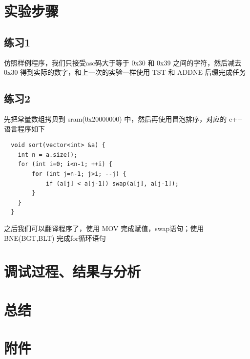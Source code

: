 \documentclass[a4paper,10pt,UTF8]{paper}
\numberwithin{equation}{section}
\numberwithin{figure}{section}
\begin{document}
\section{实验步骤}

\subsection{练习1}

仿照样例程序，我们只接受asc码大于等于 0x30 和 0x39 之间的字符，然后减去 0x30 得到实际的数字，和上一次的实验一样使用 TST 和 ADDNE 后缀完成任务

\subsection{练习2}

先把常量数组拷贝到 sram(0x20000000) 中，然后再使用冒泡排序，对应的 c++ 语言程序如下

\begin{verbatim}
  void sort(vector<int> &a) {
    int n = a.size();
    for (int i=0; i<n-1; ++i) {
        for (int j=n-1; j>i; --j) {
            if (a[j] < a[j-1]) swap(a[j], a[j-1]);
        }
    }
  }
\end{verbatim}

之后我们可以翻译程序了，使用 MOV 完成赋值，swap语句；使用 BNE(BGT,BLT) 完成for循环语句

\section{调试过程、结果与分析}



\section{总结}

\section{附件}
\end{document}
